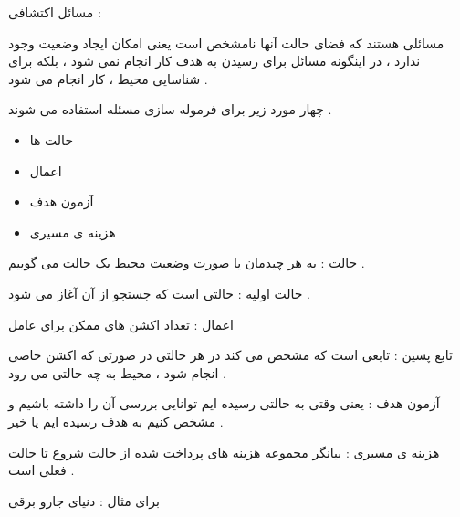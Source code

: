\documentclass[12pt]{article}
\begin{document}
\newpage


\noindent
مسائل اکتشافی 
 :

\noindent
مسائلی هستند که فضای حالت آنها نامشخص است یعنی امکان ایجاد وضعیت وجود ندارد ، در اینگونه مسائل برای رسیدن به هدف کار انجام نمی شود ، بلکه برای شناسایی محیط ، کار انجام می شود .





\vspace{30pt}


\noindent
چهار مورد زیر برای فرموله سازی مسئله استفاده می شوند .



\begin{itemize}
	\item حالت ها
	\item اعمال
	\item آزمون هدف
	\item هزینه ی مسیری
\end{itemize}



\noindent
حالت : 
به هر چیدمان یا صورت وضعیت محیط یک حالت می گوییم .


\vspace{10pt}



\noindent
حالت اولیه : حالتی است که جستجو از آن آغاز می شود .


\vspace{10pt}


\noindent
اعمال : تعداد اکشن های ممکن برای عامل


\vspace{10pt}


\noindent
تابع پسین 
 :
تابعی است که مشخص می کند در هر حالتی در صورتی که اکشن خاصی انجام شود ، محیط به چه حالتی می رود .


\vspace{10pt}


\noindent
آزمون هدف : یعنی وقتی به حالتی رسیده ایم توانایی بررسی آن را داشته باشیم و مشخص کنیم به هدف رسیده ایم یا خیر .



\vspace{10pt}


\noindent
هزینه ی مسیری : بیانگر مجموعه هزینه های پرداخت شده از حالت شروع تا حالت فعلی است .


\vspace{10pt}


\noindent
برای مثال : دنیای جارو برقی 
\end{document}
